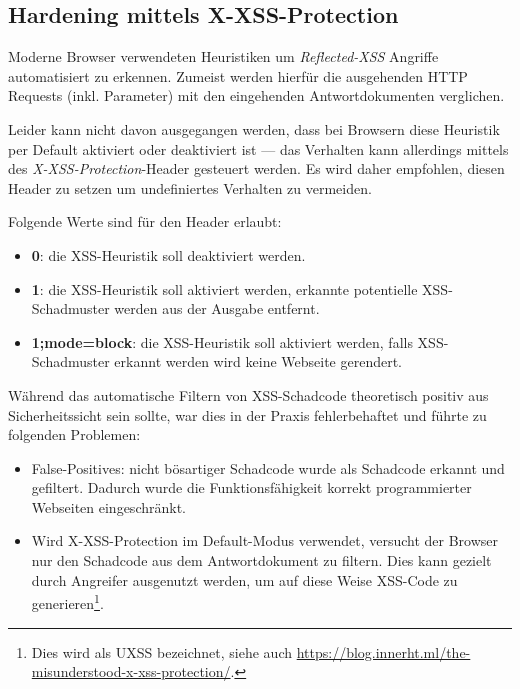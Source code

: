 \subsection{Hardening mittels X-XSS-Protection}
\label{x_xss_protection}

Moderne Browser verwendeten Heuristiken um \textit{Reflected-XSS} Angriffe automatisiert zu erkennen. Zumeist werden hierfür die ausgehenden HTTP Requests (inkl. Parameter) mit den eingehenden Antwortdokumenten verglichen.

Leider kann nicht davon ausgegangen werden, dass bei Browsern diese Heuristik per Default aktiviert oder deaktiviert ist --- das Verhalten kann allerdings mittels des \textit{X-XSS-Protection}-Header gesteuert werden. Es wird daher empfohlen, diesen Header zu setzen um undefiniertes Verhalten zu vermeiden.

Folgende Werte sind für den Header erlaubt:

\begin{itemize}
	\item \textbf{0}: die XSS-Heuristik soll deaktiviert werden.
	\item \textbf{1}: die XSS-Heuristik soll aktiviert werden, erkannte potentielle XSS-Schadmuster werden aus der Ausgabe entfernt.
	\item \textbf{1;mode=block}: die XSS-Heuristik soll aktiviert werden, falls XSS-Schadmuster erkannt werden wird keine Webseite gerendert.
\end{itemize}

Während das automatische Filtern von XSS-Schadcode theoretisch positiv aus Sicherheitssicht sein sollte, war dies in der Praxis fehlerbehaftet und führte zu folgenden Problemen:

\begin{itemize}
	\item False-Positives: nicht bösartiger Schadcode wurde als Schadcode erkannt und gefiltert. Dadurch wurde die Funktionsfähigkeit korrekt programmierter Webseiten eingeschränkt.
	\item Wird X-XSS-Protection im Default-Modus verwendet, versucht der Browser nur den Schadcode aus dem Antwortdokument zu filtern. Dies kann gezielt durch Angreifer ausgenutzt werden, um auf diese Weise XSS-Code zu generieren\footnote{Dies wird als UXSS bezeichnet, siehe auch \url{https://blog.innerht.ml/the-misunderstood-x-xss-protection/}.}.
\end{itemize}

